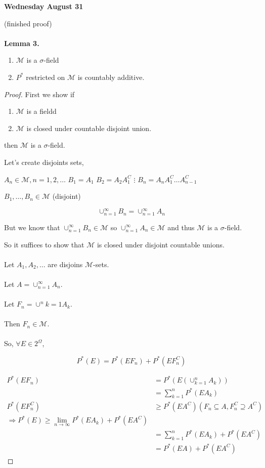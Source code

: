 \documentclass[11pt,fleqn]{book} %
\begin{document}
\textbf{Wednesday August 31}

(finished proof)\\
\\

\textbf{Lemma 3.}
	
	\begin{enumerate}
		\item $\mathscr{M}$ is a $\sigma$-field
		\item $P^*$ restricted on $\mathscr{M}$ is countably additive. 
	\end{enumerate}

\begin{proof}
	First we show if\\

	\begin{enumerate}
		\item $\mathscr{M}$ is a fieldd
		\item $\mathscr{M}$ is closed under countable disjoint union.
	\end{enumerate}

then $\mathscr{M}$ is a $\sigma$-field.

Let's create disjoints sets, 

$A_n \in \mathscr{M}, n = 1, 2, \dots$
$B_1 = A_1$
$B_2 = A_2 A^C_1$
$\vdots$
$B_n = A_n A_1^C \dots A_{n-1}^C$

$B_1, \dots, B_n \in \mathscr{M}$ (disjoint)


$$\cup^\infty_{n=1} B_n = \cup^\infty_{n=1} A_n $$

But we know that $\cup^\infty_{n=1} B_n \in \mathscr{M}$ so $\cup^\infty_{n=1} A_n \in \mathscr{M}$ and thus $\mathscr{M}$ is a $\sigma$-field.

So it suffices to show that $\mathscr{M}$ is closed under disjoint countable unions.\\
\\
Let $A_1, A_2, \dots$ are disjoins $\mathscr{M}$-sets.\\ 
\\
Let $A = \cup^\infty_{n=1} A_n$.\\ 
\\
Let $F_n = \cup^n{k=1} A_k$.\\ 
\\
Then $F_n \in \mathscr{M}$.\\
\\
So, $\forall E \in 2^\Omega$, 

$$P^*(E) = P^*(E F_n) + P^*(E F_n^C) $$

\begin{align*}
	P^*(E F_n) &= P^*(E(\cup_{k=1}^n A_k))\\
		&= \displaystyle \sum^n_{k=1} P^*(E A_k)\\
P^*(E F_n^C) &\geq P^*(E A^C)  (F_n \subseteq A, F_n^C \supseteq A^C)\\
	\Rightarrow P^*(E) \geq \lim_{n \rightarrow \infty} P^*(E A_k) + P^*(E A^C)\\
		&= \displaystyle \sum^n_{k=1} P^*(E A_k) + P^*(E A^C)\\
		&= P^*(EA) + P^*(E A^C)
\end{align*}
 

\end{proof}
\end{document}
